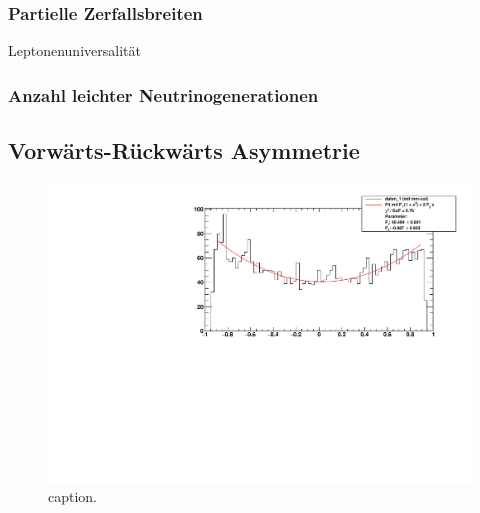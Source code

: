 \subsubsection{Partielle Zerfallsbreiten}
\label{subsub:partWidth}

Leptonenuniversalität
\subsubsection{Anzahl leichter Neutrinogenerationen}
\subsection{Vorwärts-Rückwärts Asymmetrie}
\begin{figure}[H]
\begin{center}
  \includegraphics[width=\textwidth]{../img/FBA_91-23223.pdf}
  \caption{caption.}
  \label{img:FBA}
\end{center}
\end{figure}

